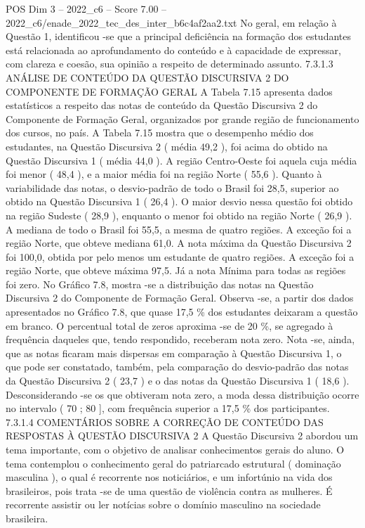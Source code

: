 \begin{textsample}{POS Dim 3 – 2022\_c6 – Score 7.00 – 2022\_c6/enade\_2022\_tec\_des\_inter\_b6c4af2aa2.txt}
No geral, em relação à Questão 1, identificou -se que a principal deficiência na formação dos estudantes está relacionada ao aprofundamento do conteúdo e à capacidade de expressar, com clareza e coesão, sua opinião a respeito de determinado assunto. 7.3.1.3 ANÁLISE DE CONTEÚDO DA QUESTÃO DISCURSIVA 2 DO COMPONENTE DE FORMAÇÃO GERAL A Tabela 7.15 apresenta dados estatísticos a respeito das notas de conteúdo da Questão Discursiva 2 do Componente de Formação Geral, organizados por grande região de funcionamento dos cursos, no país.
A Tabela 7.15 mostra que o desempenho médio dos estudantes, na Questão Discursiva 2 ( média 49,2 ), foi acima do obtido na Questão Discursiva 1 ( média 44,0 ).
A região Centro-Oeste foi aquela cuja média foi menor ( 48,4 ), e a maior média foi na região Norte ( 55,6 ).
Quanto à variabilidade das notas, o desvio-padrão de todo o Brasil foi 28,5, superior ao obtido na Questão Discursiva 1 ( 26,4 ).
O maior desvio nessa questão foi obtido na região Sudeste ( 28,9 ), enquanto o menor foi obtido na região Norte ( 26,9 ).
A mediana de todo o Brasil foi 55,5, a mesma de quatro regiões.
A exceção foi a região Norte, que obteve mediana 61,0.
A nota máxima da Questão Discursiva 2 foi 100,0, obtida por pelo menos um estudante de quatro regiões.
A exceção foi a região Norte, que obteve máxima 97,5.
Já a nota Mínima para todas as regiões foi zero.
No Gráfico 7.8, mostra -se a distribuição das notas na Questão Discursiva 2 do Componente de Formação Geral.
Observa -se, a partir dos dados apresentados no Gráfico 7.8, que quase 17,5 \% dos estudantes deixaram a questão em branco.
O percentual total de zeros aproxima -se de 20 \%, se agregado à frequência daqueles que, tendo respondido, receberam nota zero.
Nota -se, ainda, que as notas ficaram mais dispersas em comparação à Questão Discursiva 1, o que pode ser constatado, também, pela comparação do desvio-padrão das notas da Questão Discursiva 2 ( 23,7 ) e o das notas da Questão Discursiva 1 ( 18,6 ).
Desconsiderando -se os que obtiveram nota zero, a moda dessa distribuição ocorre no intervalo ( 70 ; 80 ], com frequência superior a 17,5 \% dos participantes. 7.3.1.4 COMENTÁRIOS SOBRE A CORREÇÃO DE CONTEÚDO DAS RESPOSTAS À QUESTÃO DISCURSIVA 2 A Questão Discursiva 2 abordou um tema importante, com o objetivo de analisar conhecimentos gerais do aluno.
O tema contemplou o conhecimento geral do patriarcado estrutural ( dominação masculina ), o qual é recorrente nos noticiários, e um infortúnio na vida dos brasileiros, pois trata -se de uma questão de violência contra as mulheres.
É recorrente assistir ou ler notícias sobre o domínio masculino na sociedade brasileira.

\end{textsample}
